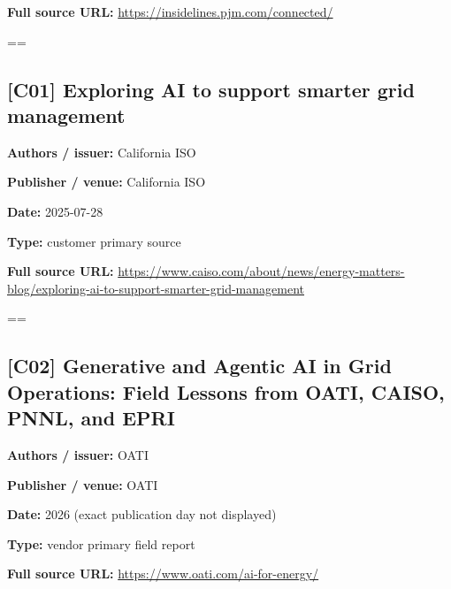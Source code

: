 \documentclass[10pt,letterpaper]{article}
\begin{document}
\textbf{Full source URL:} \href{https://insidelines.pjm.com/connected/}{\small\ttfamily https:/\allowbreak{}/\allowbreak{}insidelines.\allowbreak{}pjm.\allowbreak{}com/\allowbreak{}connected/\allowbreak{}}\par
\egroup\par\noindent\box\readingEntry\par\medskip
\setbox\readingEntry=\vbox\bgroup\hsize=\linewidth\subsection*{[C01] Exploring AI to support smarter grid management}
\textbf{Authors / issuer:} California ISO\par
\textbf{Publisher / venue:} California ISO\par
\textbf{Date:} 2025-07-28\par
\textbf{Type:} customer primary source\par
\textbf{Full source URL:} \href{https://www.caiso.com/about/news/energy-matters-blog/exploring-ai-to-support-smarter-grid-management}{\small\ttfamily https:/\allowbreak{}/\allowbreak{}www.\allowbreak{}caiso.\allowbreak{}com/\allowbreak{}about/\allowbreak{}news/\allowbreak{}energy-\allowbreak{}matters-\allowbreak{}blog/\allowbreak{}exploring-\allowbreak{}ai-\allowbreak{}to-\allowbreak{}support-\allowbreak{}smarter-\allowbreak{}grid-\allowbreak{}management}\par
\egroup\par\noindent\box\readingEntry\par\medskip
\setbox\readingEntry=\vbox\bgroup\hsize=\linewidth\subsection*{[C02] Generative and Agentic AI in Grid Operations: Field Lessons from OATI, CAISO, PNNL, and EPRI}
\textbf{Authors / issuer:} OATI\par
\textbf{Publisher / venue:} OATI\par
\textbf{Date:} 2026 (exact publication day not displayed)\par
\textbf{Type:} vendor primary field report\par
\textbf{Full source URL:} \href{https://www.oati.com/ai-for-energy/}{\small\ttfamily https:/\allowbreak{}/\allowbreak{}www.\allowbreak{}oati.\allowbreak{}com/\allowbreak{}ai-\allowbreak{}for-\allowbreak{}energy/\allowbreak{}}\par
\egroup\par\noindent\box\readingEntry\par\medskip
\end{document}
